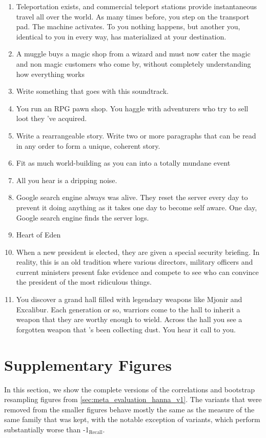 \begin{enumerate}[noitemsep]
    \item Teleportation exists, and commercial teleport stations provide instantaneous travel all over the world. As many times before, you step on the transport pad. The machine activates. To you nothing happens, but another you, identical to you in every way, has materialized at your destination.
    \item A muggle buys a magic shop from a wizard and must now cater the magic and non magic customers who come by, without completely understanding how everything works
    \item Write something that goes with this soundtrack.
    \item You run an RPG pawn shop. You haggle with adventurers who try to sell loot they 've acquired.
    \item Write a rearrangeable story. Write two or more paragraphs that can be read in any order to form a unique, coherent story.
    \item Fit as much world-building as you can into a totally mundane event
    \item All you hear is a dripping noise.
    \item Google search engine always was alive. They reset the server every day to prevent it doing anything as it takes one day to become self aware. One day, Google search engine finds the server logs.
    \item Heart of Eden
    \item When a new president is elected, they are given a special security briefing. In reality, this is an old tradition where various directors, military officers and current ministers present fake evidence and compete to see who can convince the president of the most ridiculous things.
    \item You discover a grand hall filled with legendary weapons like Mjonir and Excalibur. Each generation or so, warriors come to the hall to inherit a weapon that they are worthy enough to wield. Across the hall you see a forgotten weapon that 's been collecting dust. You hear it call to you.
\end{enumerate}

\section{Supplementary Figures}
\label{sec:supplementary_figures}

In this section, we show the complete versions of the correlations and bootstrap resampling figures from \autoref{sec:meta_evaluation_hanna_v1}. The variants that were removed from the smaller figures behave mostly the same as the measure of the same family that was kept, with the notable exception of {\rouge} variants, which perform substantially worse than {\rouge}-1$_\textrm{Recall}$.

